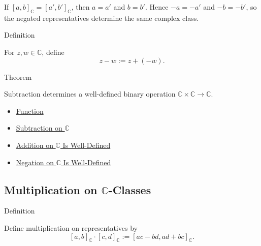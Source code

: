 \begin{remark*}
If \([a,b]_{\mathbb{C}}=[a',b']_{\mathbb{C}}\), then \(a=a'\) and
\(b=b'\). Hence \(-a=-a'\) and \(-b=-b'\), so the negated representatives
determine the same complex class.
\end{remark*}

\begin{definitionbox}{Definition}
\begin{definition}
\label{def:subtraction-on-c}
For $z,w\in\mathbb{C}$, define
\[
z-w:=z+(-w).
\]
\end{definition}
\end{definitionbox}

\begin{theorembox}{Theorem}
\begin{theorem}
\label{thm:subtraction-on-c-well-defined}
Subtraction determines a well-defined binary operation
\(\mathbb{C}\times\mathbb{C}\to\mathbb{C}\).
\end{theorem}
\end{theorembox}

\begin{dependencies}
\begin{itemize}
  \item \hyperref[def:function]{Function}
  \item \hyperref[def:subtraction-on-c]{Subtraction on $\mathbb{C}$}
  \item \hyperref[thm:addition-on-c-well-defined]{Addition on $\mathbb{C}$ Is Well-Defined}
  \item \hyperref[thm:negation-on-c-well-defined]{Negation on $\mathbb{C}$ Is Well-Defined}
\end{itemize}
\end{dependencies}

\subsection*{Multiplication on $\mathbb{C}$-Classes}

\begin{definitionbox}{Definition}
\begin{definition}
\label{def:multiplication-on-c-classes}
Define multiplication on representatives by
\[
[a,b]_{\mathbb{C}}\cdot[c,d]_{\mathbb{C}}
:=[ac-bd,ad+bc]_{\mathbb{C}}.
\]
\end{definition}
\end{definitionbox}

